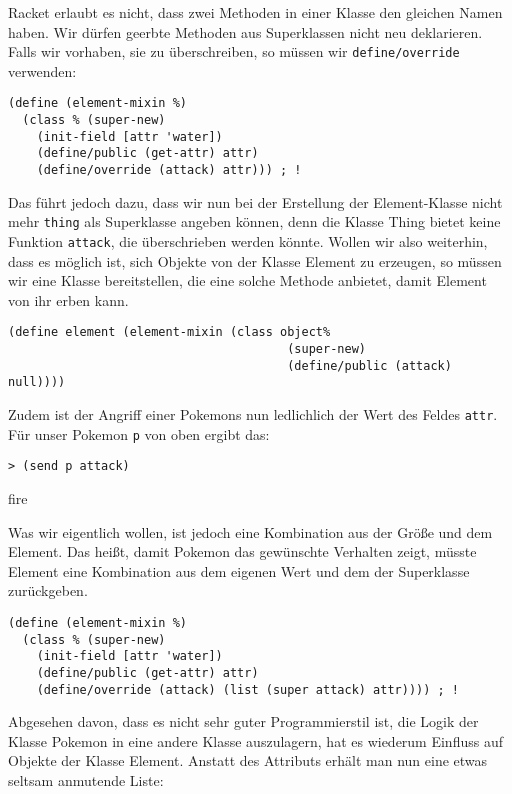 Racket erlaubt es nicht, dass zwei Methoden in einer Klasse den gleichen Namen haben. Wir dürfen geerbte Methoden aus Superklassen nicht neu deklarieren. Falls wir vorhaben, sie zu überschreiben, so müssen wir \texttt{define/override} verwenden:

\begin{lstlisting}
(define (element-mixin %)
  (class % (super-new)
    (init-field [attr 'water])
    (define/public (get-attr) attr)
    (define/override (attack) attr))) ; !
\end{lstlisting}

Das führt jedoch dazu, dass wir nun bei der Erstellung der Element-Klasse nicht mehr \texttt{thing} als Superklasse angeben können, denn die Klasse Thing bietet keine Funktion \texttt{attack}, die überschrieben werden könnte. Wollen wir also weiterhin, dass es möglich ist, sich Objekte von der Klasse Element zu erzeugen, so müssen wir eine Klasse bereitstellen, die eine solche Methode anbietet, damit Element von ihr erben kann.

\begin{lstlisting}
(define element (element-mixin (class object% 
                                       (super-new)
                                       (define/public (attack) null))))
\end{lstlisting}

Zudem ist der Angriff einer Pokemons nun ledlichlich der Wert des Feldes \texttt{attr}. Für unser Pokemon \texttt{p} von oben ergibt das:
\begin{lstlisting}
> (send p attack)
\end{lstlisting}
{\rsymbol fire}

Was wir eigentlich wollen, ist jedoch eine Kombination aus der Größe und dem Element. Das heißt, damit Pokemon das gewünschte Verhalten zeigt, müsste Element eine Kombination aus dem eigenen Wert und dem der Superklasse zurückgeben.

\begin{lstlisting}
(define (element-mixin %)
  (class % (super-new)
    (init-field [attr 'water])
    (define/public (get-attr) attr)
    (define/override (attack) (list (super attack) attr)))) ; !
\end{lstlisting}

Abgesehen davon, dass es nicht sehr guter Programmierstil ist, die Logik der Klasse Pokemon in eine andere Klasse auszulagern, hat es wiederum Einfluss auf Objekte der Klasse Element. Anstatt des Attributs erhält man nun eine etwas seltsam anmutende Liste:

